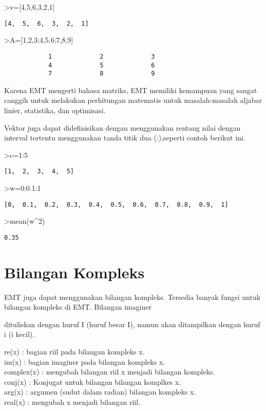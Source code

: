 \documentclass[
]{book}
\begin{document}
\textgreater v={[}4,5,6,3,2,1{]}

\begin{verbatim}
[4,  5,  6,  3,  2,  1]
\end{verbatim}

\textgreater A={[}1,2,3;4,5,6;7,8,9{]}

\begin{verbatim}
            1             2             3 
            4             5             6 
            7             8             9 
\end{verbatim}

Karena EMT mengerti bahasa matriks, EMT memiliki kemampuan yang sangat canggih untuk melakukan perhitungan matematis untuk masalah-masalah aljabar linier, statistika, dan optimisasi.

Vektor juga dapat didefinisikan dengan menggunakan rentang nilai dengan interval tertentu menggunakan tanda titik dua (:),seperti contoh berikut ini.

\textgreater c=1:5

\begin{verbatim}
[1,  2,  3,  4,  5]
\end{verbatim}

\textgreater w=0:0.1:1

\begin{verbatim}
[0,  0.1,  0.2,  0.3,  0.4,  0.5,  0.6,  0.7,  0.8,  0.9,  1]
\end{verbatim}

\textgreater mean(w\^{}2)

\begin{verbatim}
0.35
\end{verbatim}

\chapter{Bilangan Kompleks}\label{bilangan-kompleks}

EMT juga dapat menggunakan bilangan kompleks. Tersedia banyak fungsi untuk bilangan kompleks di EMT. Bilangan imaginer

dituliskan dengan huruf I (huruf besar I), namun akan ditampilkan dengan huruf i (i kecil).

re(x) : bagian riil pada bilangan kompleks x.\\
im(x) : bagian imaginer pada bilangan kompleks x.\\
complex(x) : mengubah bilangan riil x menjadi bilangan kompleks.\\
conj(x) : Konjugat untuk bilangan bilangan komplkes x.\\
arg(x) : argumen (sudut dalam radian) bilangan kompleks x.\\
real(x) : mengubah x menjadi bilangan riil.
\end{document}
